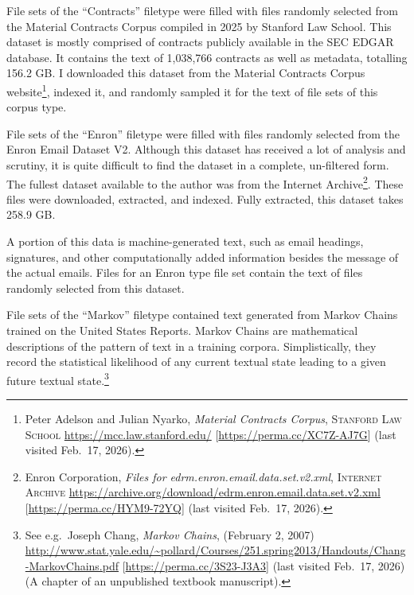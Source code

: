 \documentclass[
]{article}
\begin{document}
File sets of the ``Contracts'' filetype were filled with files randomly selected from the Material Contracts Corpus compiled in 2025 by Stanford Law School. This dataset is mostly comprised of contracts publicly available in the SEC EDGAR database. It contains the text of 1,038,766 contracts as well as metadata, totalling 156.2 GB. I downloaded this dataset from the Material Contracts Corpus website\footnote{Peter Adelson and Julian Nyarko, \emph{Material Contracts Corpus}, \textsc{Stanford Law School} \url{https://mcc.law.stanford.edu/} {[}\url{https://perma.cc/XC7Z-AJ7G}{]} (last visited Feb.~17, 2026).}, indexed it, and randomly sampled it for the text of file sets of this corpus type.

File sets of the ``Enron'' filetype were filled with files randomly selected from the Enron Email Dataset V2. Although this dataset has received a lot of analysis and scrutiny, it is quite difficult to find the dataset in a complete, un-filtered form. The fullest dataset available to the author was from the Internet Archive\footnote{Enron Corporation, \emph{Files for edrm.enron.email.data.set.v2.xml}, \textsc{Internet Archive} \url{https://archive.org/download/edrm.enron.email.data.set.v2.xml} {[}\url{https://perma.cc/HYM9-72YQ}{]} (last visited Feb.~17, 2026).}. These files were downloaded, extracted, and indexed. Fully extracted, this dataset takes 258.9 GB.

A portion of this data is machine-generated text, such as email headings, signatures, and other computationally added information besides the message of the actual emails. Files for an Enron type file set contain the text of files randomly selected from this dataset.

File sets of the ``Markov'' filetype contained text generated from Markov Chains trained on the United States Reports. Markov Chains are mathematical descriptions of the pattern of text in a training corpora. Simplistically, they record the statistical likelihood of any current textual state leading to a given future textual state.\footnote{See e.g.~Joseph Chang, \emph{Markov Chains}, (February 2, 2007) \url{http://www.stat.yale.edu/~pollard/Courses/251.spring2013/Handouts/Chang-MarkovChains.pdf} {[}\url{https://perma.cc/3S23-J3A3}{]} (last visited Feb.~17, 2026) (A chapter of an unpublished textbook manuscript).}
\end{document}
